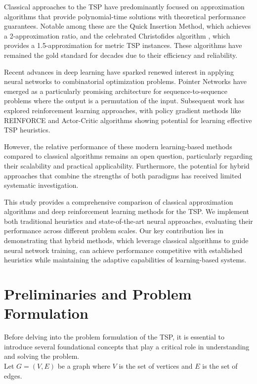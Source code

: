 \documentclass[12pt]{article}
\theoremstyle{remarkstyle}
\begin{document}
Classical approaches to the TSP have predominantly focused on approximation algorithms that provide polynomial-time solutions with theoretical performance guarantees. Notable among these are the Quick Insertion Method, which achieves a 2-approximation ratio, and the celebrated Christofides algorithm \cite{christofides2022worst}, which provides a 1.5-approximation for metric TSP instances. These algorithms have remained the gold standard for decades due to their efficiency and reliability.

Recent advances in deep learning have sparked renewed interest in applying neural networks to combinatorial optimization problems. Pointer Networks \cite{vinyals2015pointer} have emerged as a particularly promising architecture for sequence-to-sequence problems where the output is a permutation of the input. Subsequent work has explored reinforcement learning approaches, with policy gradient methods like REINFORCE \cite{williams1992simple} and Actor-Critic algorithms \cite{sutton1998reinforcement} showing potential for learning effective TSP heuristics.

However, the relative performance of these modern learning-based methods compared to classical algorithms remains an open question, particularly regarding their scalability and practical applicability. Furthermore, the potential for hybrid approaches that combine the strengths of both paradigms has received limited systematic investigation.

This study provides a comprehensive comparison of classical approximation algorithms and deep reinforcement learning methods for the TSP. We implement both traditional heuristics and state-of-the-art neural approaches, evaluating their performance across different problem scales. Our key contribution lies in demonstrating that hybrid methods, which leverage classical algorithms to guide neural network training, can achieve performance competitive with established heuristics while maintaining the adaptive capabilities of learning-based systems.


	
	
	
	\section{Preliminaries and Problem Formulation}
	Before delving into the problem formulation of the TSP, it is essential to introduce several foundational concepts that play a critical role in understanding and solving the problem.\\
	Let \( G = (V, E) \) be a graph where \( V \) is the set of vertices and \( E \) is the set of edges.
	
\end{document}
